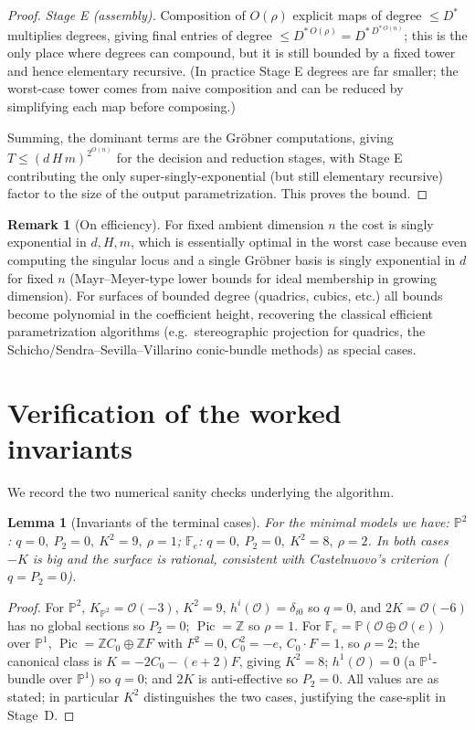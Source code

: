 \documentclass{amsart}
\theoremstyle{plain}
\newtheorem{lemma}{Lemma}
\theoremstyle{definition}
\newtheorem{remark}{Remark}
\newcommand{\PP}{\mathbb{P}}
\newcommand{\cO}{\mathcal{O}}
\DeclareMathOperator{\Pic}{Pic}
\begin{document}
\begin{proof}
\emph{Stage E (assembly).}  Composition of $O(\rho)$ explicit maps of degree
$\le D^*$ multiplies degrees, giving final entries of degree $\le D^{*\,O(\rho)}=
D^{*\,D^{*\,O(n)}}$; this is the only place where degrees can compound, but it is
still bounded by a fixed tower and hence elementary recursive.  (In practice
Stage E degrees are far smaller; the worst-case tower comes from naive
composition and can be reduced by simplifying each map before composing.)

Summing, the dominant terms are the Gr\"obner computations, giving
$T\le(d\,H\,m)^{2^{O(n)}}$ for the decision and reduction stages, with Stage E
contributing the only super-singly-exponential (but still elementary recursive)
factor to the size of the output parametrization.  This proves the bound.
\end{proof}

\begin{remark}[On efficiency]
For fixed ambient dimension $n$ the cost is singly exponential in $d,H,m$, which
is essentially optimal in the worst case because even computing the singular
locus and a single Gr\"obner basis is singly exponential in $d$ for fixed $n$
(Mayr--Meyer-type lower bounds for ideal membership in growing dimension).  For
surfaces of bounded degree (quadrics, cubics, etc.) all bounds become polynomial
in the coefficient height, recovering the classical efficient parametrization
algorithms (e.g.\ stereographic projection for quadrics, the
Schicho/Sendra--Sevilla--Villarino conic-bundle methods) as special cases.
\end{remark}

\section{Verification of the worked invariants}

We record the two numerical sanity checks underlying the algorithm.

\begin{lemma}[Invariants of the terminal cases]\label{lem:invariants}
For the minimal models we have:
$\PP^2$: $q=0,\ P_2=0,\ K^2=9,\ \rho=1$;\quad
$\mathbb F_e$: $q=0,\ P_2=0,\ K^2=8,\ \rho=2$.
In both cases $-K$ is big and the surface is rational, consistent with
Castelnuovo's criterion ($q=P_2=0$).
\end{lemma}

\begin{proof}
For $\PP^2$, $K_{\PP^2}=\cO(-3)$, $K^2=9$, $h^i(\cO)=\delta_{i0}$ so $q=0$, and
$2K=\cO(-6)$ has no global sections so $P_2=0$; $\Pic=\mathbb Z$ so $\rho=1$.
For $\mathbb F_e=\PP(\cO\oplus\cO(e))$ over $\PP^1$, $\Pic=\mathbb Z C_0\oplus
\mathbb Z F$ with $F^2=0$, $C_0^2=-e$, $C_0\cdot F=1$, so $\rho=2$; the canonical
class is $K=-2C_0-(e+2)F$, giving $K^2=8$; $h^1(\cO)=0$ (a $\PP^1$-bundle over
$\PP^1$) so $q=0$; and $2K$ is anti-effective so $P_2=0$.  All values are as
stated; in particular $K^2$ distinguishes the two cases, justifying the
case-split in Stage~D.
\end{proof}
\end{document}
